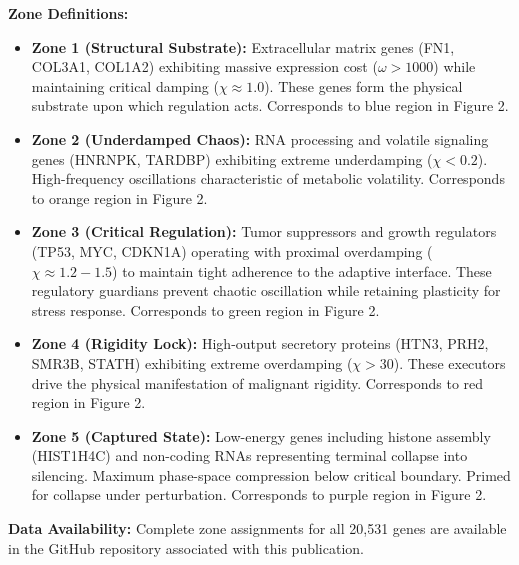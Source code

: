 \documentclass[11pt,letterpaper]{article}
\begin{document}
\textbf{Zone Definitions:}
\begin{itemize}
\item \textbf{Zone 1 (Structural Substrate):} Extracellular matrix genes (FN1, COL3A1, COL1A2) exhibiting massive expression cost ($\omega > 1000$) while maintaining critical damping ($\chi \approx 1.0$). These genes form the physical substrate upon which regulation acts. Corresponds to blue region in Figure 2.

\item \textbf{Zone 2 (Underdamped Chaos):} RNA processing and volatile signaling genes (HNRNPK, TARDBP) exhibiting extreme underdamping ($\chi < 0.2$). High-frequency oscillations characteristic of metabolic volatility. Corresponds to orange region in Figure 2.

\item \textbf{Zone 3 (Critical Regulation):} Tumor suppressors and growth regulators (TP53, MYC, CDKN1A) operating with proximal overdamping ($\chi \approx 1.2-1.5$) to maintain tight adherence to the adaptive interface. These regulatory guardians prevent chaotic oscillation while retaining plasticity for stress response. Corresponds to green region in Figure 2.

\item \textbf{Zone 4 (Rigidity Lock):} High-output secretory proteins (HTN3, PRH2, SMR3B, STATH) exhibiting extreme overdamping ($\chi > 30$). These executors drive the physical manifestation of malignant rigidity. Corresponds to red region in Figure 2.

\item \textbf{Zone 5 (Captured State):} Low-energy genes including histone assembly (HIST1H4C) and non-coding RNAs representing terminal collapse into silencing. Maximum phase-space compression below critical boundary. Primed for collapse under perturbation. Corresponds to purple region in Figure 2.
\end{itemize}

\textbf{Data Availability:} Complete zone assignments for all 20,531 genes are available in the GitHub repository associated with this publication.
\end{document}
